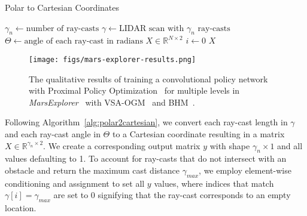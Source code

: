 \begin{algorithm}
    \caption{Polar to Cartesian Coordinates}\label{alg:polar2cartesian}
    \begin{algorithmic}
        \REQUIRE $\gamma_n\gets\text{number of ray-casts}$
        \REQUIRE $\gamma \gets \text{LIDAR scan with } \gamma_n \text{ ray-casts}$
        \REQUIRE $\Theta \gets \text{angle of each ray-cast in radians}$
        \STATE $X\in \mathbb{R}^{N\times 2}$
        \STATE $i \gets 0$
        \ENDWHILE
        \RETURN $X$
    \end{algorithmic}
\end{algorithm}

\begin{figure*}[ht]
    \centering
    \texttt{[image: figs/mars-explorer-results.png]}
    \caption{The qualitative results of training a convolutional policy network with Proximal Policy Optimization~\cite{schulman2017proximalpolicyoptimizationalgorithms} for multiple levels in \textit{MarsExplorer}~\cite{Koutras2021MarsExplorer} with VSA-OGM~\cite{snyder2024brain} and BHM~\cite{senanayake2017bayesian}.}
    \label{fig:mars-results}
\end{figure*}

Following Algorithm~\ref{alg:polar2cartesian}, we convert each ray-cast length in $\gamma$ and each ray-cast angle in $\Theta$ to a Cartesian coordinate resulting in a matrix $X\in \mathbb{R}^{\gamma_n \times 2}$. We create a corresponding output matrix $y$ with shape $\gamma_n \times1$ and all values defaulting to 1. To account for ray-casts that do not intersect with an obstacle and return the maximum cast distance $\gamma_{max}$, we employ element-wise conditioning and assignment to set all $y$ values, where indices that match $\gamma[i]=\gamma_{max}$ are set to 0 signifying that the ray-cast corresponds to an empty location.

